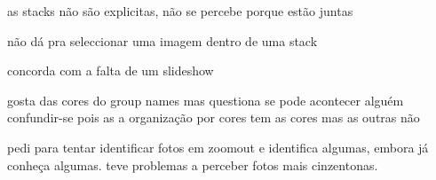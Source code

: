 {\begin{myitemize}
	\item as stacks não são explicitas, não se percebe porque estão juntas

	\item não dá pra seleccionar uma imagem dentro de uma stack

	\item concorda com a falta de um slideshow

	\item gosta das cores do group names mas questiona se pode acontecer alguém confundir-se pois as a organização por cores tem as cores mas as outras não


	\item pedi para tentar identificar fotos em zoomout e identifica algumas, embora já conheça algumas. teve problemas a perceber fotos mais cinzentonas.

\end{myitemize}


}

